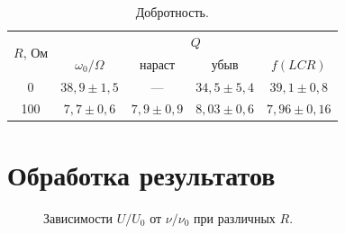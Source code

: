 \documentclass[a4paper,12pt]{article} %
\begin{document}
		
	\begin{table}[H]
		\caption{Добротность.}
		\label{table:dobrotnost}
		\begin{tabular}{|c||c|c|c|c|}
			\hline
			\multirow{2}{*}{$R$, Ом}  & \multicolumn{4}{c|}{$Q$} \\ \cline{2-5}
			& $\omega_0/\Omega$ & нараст & убыв & $f(LCR)$ \\
			\hline \hline
			0  & $38,9 \pm 1,5$  & --- & $34,5 \pm 5,4$ & $39,1 \pm 0,8$ \\
			100  & $7,7 \pm 0,6$ & $7,9 \pm 0,9$ & $8,03 \pm 0,6$ & $7,96 \pm 0,16$ \\ \hline
		\end{tabular}
	\end{table}
	
	
\newpage
\section{Обработка результатов}
	\begin{figure}[H]
		\caption{Зависимости $U/U_0$ от $\nu/\nu_0$ при различных $R$.}
		\label{ris:graph}
	\end{figure}
\end{document}
